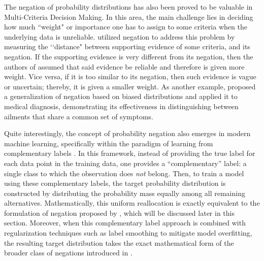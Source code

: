 \documentclass[pdflatex,sn-basic,iicol]{sn-jnl}%
\theoremstyle{thmstyleone}%
\theoremstyle{thmstyletwo}%
\theoremstyle{thmstylethree}%
\begin{document}
The negation of probability distributions has also been proved 
to be valuable in Multi-Criteria Decision Making. In this area, the main challenge lies in deciding how much ``weight" or importance one has to assign to some criteria when the underlying data is unreliable. \cite{Sun2020} utilized negation to address this problem by measuring the \lq\lq distance"
between supporting evidence of some criteria,
and its negation. If the supporting
evidence is very different from its negation, then the authors of \citep{Sun2020} assumed that said evidence be 
reliable and therefore is given more weight. Vice versa, if it is too similar to its negation, then such
evidence  is vague or uncertain; thereby, it is given a smaller weight. As another example, \cite{tanwar2023generalization} proposed a generalization of negation based on biased distributions and applied it to medical diagnosis, demonstrating its effectiveness in distinguishing between ailments that share a common set of symptoms.

Quite interestingly, the concept of probability negation also emerges in modern machine learning, specifically within the paradigm of learning from complementary labels \citep{ishida2017learning}. In this framework, instead of providing the true label for each data point in the training data, one provides a ``complementary'' label: a single class to which the observation does \textit{not} belong. Then, to train a model using these complementary labels, the target probability distribution is constructed by distributing the probability mass equally among all remaining alternatives. Mathematically, this uniform reallocation is exactly equivalent to the formulation of negation proposed by \cite{Yager2015}, which will be discussed later in this section. Moreover, when this complementary label approach is combined with regularization techniques such as label smoothing \citep{szegedy2016rethinking} to mitigate model overfitting, the resulting target distribution takes the exact mathematical form of the broader class of negations introduced in \citep{generating, klein2022some}.
\end{document}

